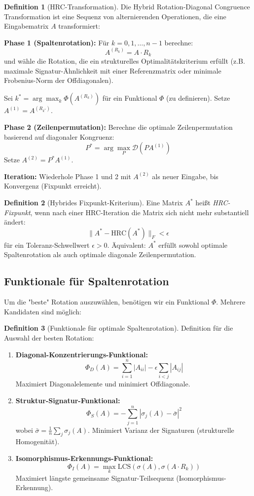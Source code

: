 \documentclass[a4paper,12pt]{article}
\theoremstyle{definition}
\newtheorem{definition}{Definition}
\begin{document}
\begin{definition}[HRC-Transformation]
	Die Hybrid Rotation-Diagonal Congruence Transformation ist eine Sequenz von alternierenden Operationen, die eine Eingabematrix $A$ transformiert:
	
	\textbf{Phase 1 (Spaltenrotation):} Für $k = 0, 1, \ldots, n-1$ berechne:
	\[
	A^{(R_k)} = A \cdot R_k
	\]
	und wähle die Rotation, die ein strukturelles Optimalitätskriterium erfüllt (z.B. maximale Signatur-Ähnlichkeit mit einer Referenzmatrix oder minimale Frobenius-Norm der Offdiagonalen).
	
	Sei $k^* = \arg\max_k \Phi(A^{(R_k)})$ für ein Funktional $\Phi$ (zu definieren). Setze $A^{(1)} = A^{(R_{k^*})}$.
	
	\textbf{Phase 2 (Zeilenpermutation):} Berechne die optimale Zeilenpermutation basierend auf diagonaler Kongruenz:
	\[
	P^* = \arg\max_P \mathcal{D}(PA^{(1)})
	\]
	Setze $A^{(2)} = P^* A^{(1)}$.
	
	\textbf{Iteration:} Wiederhole Phase 1 und 2 mit $A^{(2)}$ als neuer Eingabe, bis Konvergenz (Fixpunkt erreicht).
\end{definition}

\begin{definition}[Hybrides Fixpunkt-Kriterium]
	Eine Matrix $A^*$ heißt \emph{HRC-Fixpunkt}, wenn nach einer HRC-Iteration die Matrix sich nicht mehr substantiell ändert:
	\[
	\|A^* - \text{HRC}(A^*)\|_F < \epsilon
	\]
	für ein Toleranz-Schwellwert $\epsilon > 0$. Äquivalent: $A^*$ erfüllt sowohl optimale Spaltenrotation als auch optimale diagonale Zeilenpermutation.
\end{definition}

\subsection{Funktionale für Spaltenrotation}

Um die "beste" Rotation auszuwählen, benötigen wir ein Funktional $\Phi$. Mehrere Kandidaten sind möglich:

\begin{definition}[Funktionale für optimale Spaltenrotation] Definition für die Auswahl der besten Rotation:
	\begin{enumerate}
		\item \textbf{Diagonal-Konzentrierungs-Funktional:}
		\[
		\Phi_D(A) = \sum_{i=1}^{n} |A_{ii}| - \epsilon \sum_{i < j} |A_{ij}|
		\]
		Maximiert Diagonalelemente und minimiert Offdiagonale.
		
		\item \textbf{Struktur-Signatur-Funktional:}
		\[
		\Phi_S(A) = -\sum_{j=1}^{n} |\sigma_j(A) - \bar{\sigma}|^2
		\]
		wobei $\bar{\sigma} = \frac{1}{n}\sum_j \sigma_j(A)$. Minimiert Varianz der Signaturen (strukturelle Homogenität).
		
		\item \textbf{Isomorphismus-Erkennungs-Funktional:}
		\[
		\Phi_I(A) = \max_k \text{LCS}(\sigma(A), \sigma(A \cdot R_k))
		\]
		Maximiert längste gemeinsame Signatur-Teilsequenz (Isomorphismus-Erkennung).
	\end{enumerate}
\end{definition}
\end{document}

